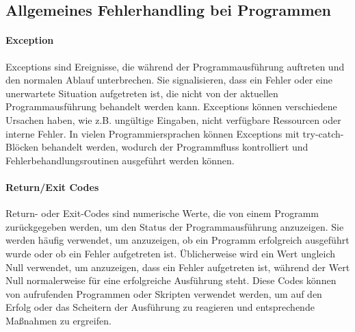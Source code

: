 \subsection{Allgemeines Fehlerhandling bei Programmen}
\label{sec:Fehlerhandling}

\paragraph{Exception}

Exceptions sind Ereignisse, die während der Programmausführung auftreten und den normalen Ablauf unterbrechen. Sie signalisieren, dass ein Fehler oder eine unerwartete Situation aufgetreten ist, die nicht von der aktuellen Programmausführung behandelt werden kann. Exceptions können verschiedene Ursachen haben, wie z.B. ungültige Eingaben, nicht verfügbare Ressourcen oder interne Fehler. In vielen Programmiersprachen können Exceptions mit try-catch-Blöcken behandelt werden, wodurch der Programmfluss kontrolliert und Fehlerbehandlungsroutinen ausgeführt werden können.

\paragraph{Return/Exit Codes}

Return- oder Exit-Codes sind numerische Werte, die von einem Programm zurückgegeben werden, um den Status der Programmausführung anzuzeigen. Sie werden häufig verwendet, um anzuzeigen, ob ein Programm erfolgreich ausgeführt wurde oder ob ein Fehler aufgetreten ist. Üblicherweise wird ein Wert ungleich Null verwendet, um anzuzeigen, dass ein Fehler aufgetreten ist, während der Wert Null normalerweise für eine erfolgreiche Ausführung steht. Diese Codes können von aufrufenden Programmen oder Skripten verwendet werden, um auf den Erfolg oder das Scheitern der Ausführung zu reagieren und entsprechende Maßnahmen zu ergreifen.